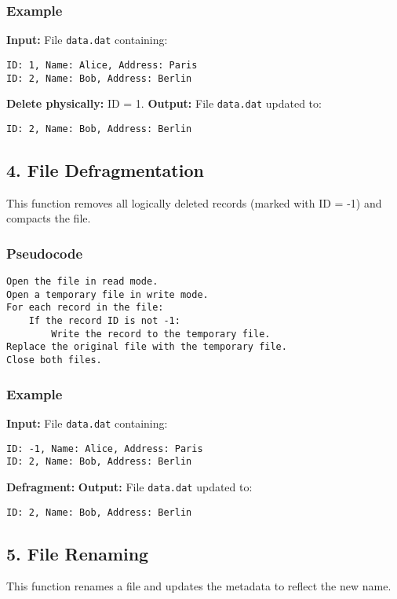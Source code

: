 \documentclass[a4paper, 12pt]{article}
\begin{document}
\subsubsection*{Example}
\textbf{Input:} File \texttt{data.dat} containing:
\begin{verbatim}
ID: 1, Name: Alice, Address: Paris
ID: 2, Name: Bob, Address: Berlin
\end{verbatim}
\textbf{Delete physically:} ID = 1.\newline
\textbf{Output:} File \texttt{data.dat} updated to:
\begin{verbatim}
ID: 2, Name: Bob, Address: Berlin
\end{verbatim}

\subsection*{4. File Defragmentation}
This function removes all logically deleted records (marked with ID = -1) and compacts the file.

\subsubsection*{Pseudocode}
\begin{verbatim}
Open the file in read mode.
Open a temporary file in write mode.
For each record in the file:
    If the record ID is not -1:
        Write the record to the temporary file.
Replace the original file with the temporary file.
Close both files.
\end{verbatim}

\subsubsection*{Example}
\textbf{Input:} File \texttt{data.dat} containing:
\begin{verbatim}
ID: -1, Name: Alice, Address: Paris
ID: 2, Name: Bob, Address: Berlin
\end{verbatim}
\textbf{Defragment:}\newline
\textbf{Output:} File \texttt{data.dat} updated to:
\begin{verbatim}
ID: 2, Name: Bob, Address: Berlin
\end{verbatim}

\subsection*{5. File Renaming}
This function renames a file and updates the metadata to reflect the new name.
\end{document}
